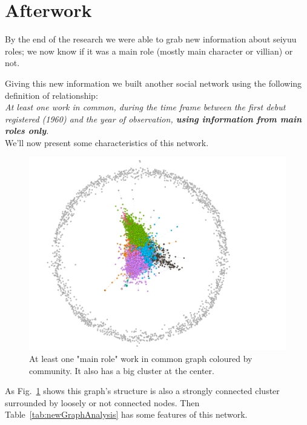 \section{Afterwork}
By the end of the research we were able to grab new information about seiyuu roles; we now know if it was a main role (mostly main character or villian) or not.

Giving this new information we built another social network using the following definition of relationship:\\

\textit{At least one work in common, during the time frame between the first debut registered (1960) and the year of observation, \textbf{using information from  main roles only}.}\\

We'll now present some characteristics of this network.

\begin{figure}[!hbt]
	\begin{center}
	\includegraphics[width=\columnwidth]{graphics/atLeast1WorksOnlyMainRoleCommunity.png}
	\caption{At least one "main role" work in common graph coloured by community. It also has a big cluster at the center.}
	\label{fig:graph1MWCommunityColoured}
	\end{center}
\end{figure}

As Fig.~\ref{fig:graph1MWCommunityColoured} shows this graph's structure is also a strongly connected cluster surrounded by loosely or not connected nodes. Then Table~\ref{tab:newGraphAnalysis} has some features of this network.

